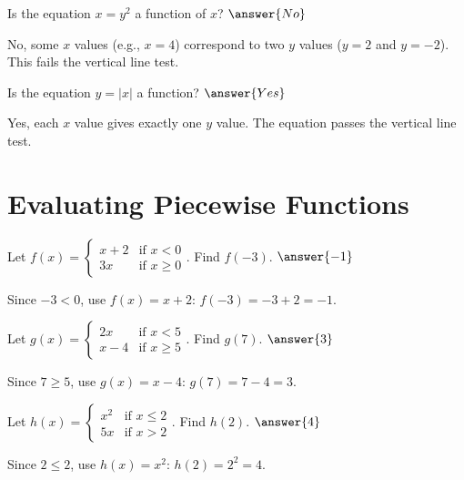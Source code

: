 \documentclass{ximera}
\begin{document}
\begin{problem}
Is the equation $x = y^2$ a function of $x$? $\answer{No}$
\begin{feedback}
No, some $x$ values (e.g., $x = 4$) correspond to two $y$ values ($y = 2$ and $y = -2$). This fails the vertical line test.
\end{feedback}
\end{problem}

\begin{problem}
Is the equation $y = |x|$ a function? $\answer{Yes}$
\begin{feedback}
Yes, each $x$ value gives exactly one $y$ value. The equation passes the vertical line test.
\end{feedback}
\end{problem}



\section*{Evaluating Piecewise Functions}

\begin{problem}
Let $f(x) = \begin{cases} x+2 & \text{if } x < 0 \\ 3x & \text{if } x \geq 0 \end{cases}$. Find $f(-3)$.
$\answer{-1}$
\begin{feedback}
Since $-3 < 0$, use $f(x) = x+2$: $f(-3) = -3 + 2 = -1$.
\end{feedback}
\end{problem}

\begin{problem}
Let $g(x) = \begin{cases} 2x & \text{if } x < 5 \\ x-4 & \text{if } x \geq 5 \end{cases}$. Find $g(7)$.
$\answer{3}$
\begin{feedback}
Since $7 \geq 5$, use $g(x) = x-4$: $g(7) = 7 - 4 = 3$.
\end{feedback}
\end{problem}

\begin{problem}
Let $h(x) = \begin{cases} x^2 & \text{if } x \leq 2 \\ 5x & \text{if } x > 2 \end{cases}$. Find $h(2)$.
$\answer{4}$
\begin{feedback}
Since $2 \leq 2$, use $h(x) = x^2$: $h(2) = 2^2 = 4$.
\end{feedback}
\end{problem}

\end{document}
